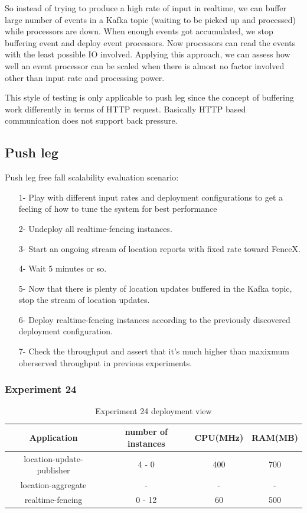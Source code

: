 \documentclass[a4]{report}
\begin{document}
    So instead of trying to produce a high rate of input in realtime, we can buffer large number of events in a Kafka
    topic (waiting to be picked up and processed) while processors are down.
    When enough events got accumulated, we stop buffering event and deploy event processors.
    Now processors can read the events with the least possible IO involved.
    Applying this approach, we can assess how well an event processor can be scaled when there is almost no factor
    involved other than input rate and processing power.

    This style of testing is only applicable to push leg since the concept of buffering work differently in terms of
    HTTP request.
    Basically HTTP based communication does not support back pressure.

    \subsection{Push leg}
    Push leg free fall scalability evaluation scenario:
    \begin{itemize}
        \item[1-] Play with different input rates and deployment configurations to get a feeling of how to tune the
        system for best performance
        \item[2-] Undeploy all realtime-fencing instances.
        \item[3-] Start an ongoing stream of location reports with fixed rate toward FenceX.
        \item[4-] Wait 5 minutes or so.
        \item[5-] Now that there is plenty of location updates buffered in the Kafka topic, stop the stream of
        location updates.
        \item[6-] Deploy realtime-fencing instances according to the previously discovered deployment configuration.
        \item[7-] Check the throughput and assert that it's much higher than maxixmum oberserved throughput in
        previous experiments.
    \end{itemize}

    \subsubsection{Experiment 24}
    \begin{table}[h!]
        \centering
        \begin{tabular}{|c|c|c|c|}
            \hline
            Application               & number of instances & CPU(MHz) & RAM(MB) \\
            \hline
            location-update-publisher & 4 - 0               & 400      & 700     \\
            location-aggregate        & -                   & -        & -       \\
            realtime-fencing          & 0 - 12              & 60       & 500     \\
            \hline
        \end{tabular}
        \caption{Experiment 24 deployment view}
        \label{table:ex24-dv}
    \end{table}
\end{document}
